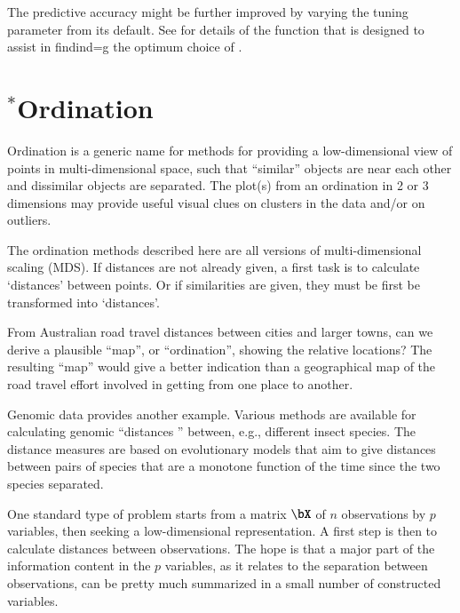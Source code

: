 The predictive accuracy might be further improved by varying the
tuning parameter  from its default.  See 
for details of the function  that is designed to
assist in findind=g the optimum choice of .

\section{$^*$Ordination}

Ordination is a generic name for methods for providing a low-dimensional
view of points in multi-dimensional space, such that ``similar'' objects
are near each other and dissimilar objects are separated.  The plot(s)
from an ordination in 2 or 3 dimensions may provide useful visual clues
on clusters in the data and/or on outliers.

The ordination methods described here are all versions of
multi-dimensional scaling (MDS).  If distances are not already given,
a first task is to calculate `distances' between points.  Or if
similarities are given, they must be first be transformed into 
`distances'.

From Australian road travel distances between cities and larger towns,
can we derive a plausible ``map'', or ``ordination'', showing the relative
locations?  The resulting ``map'' would give a better indication
than a geographical map of the road travel effort involved in getting
from one place to another.

Genomic data provides another example. Various methods are available
for calculating genomic ``distances '' between, e.g., different insect
species. The distance measures are based on evolutionary models that
aim to give distances between pairs of species that are a monotone
function of the time since the two species separated.

One standard type of problem starts from a matrix $\bX$ of $n$
observations by $p$ variables, then seeking a low-dimensional
representation.  A first step is then to calculate distances between
observations.
  The hope is that a major part of the information
content in the $p$ variables, as it relates to the separation between
observations, can be pretty much summarized in a small number of
constructed variables.

